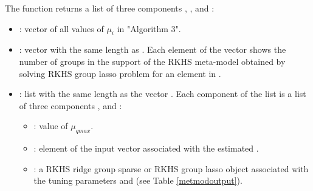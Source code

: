 The  function returns a list of three components , , and :
\begin{itemize}
\item {}: vector of all values of $\mu_i$ in "Algorithm 3".
\item {}: vector with the same length as . Each element of the vector shows the number of groups in the support of the RKHS meta-model obtained by solving RKHS group lasso problem for an element in .
\item {}: list with the same length as the vector . Each component of the list is a list of three components ,  and :
\begin{itemize}
\item {}: value of $\mu_{qmax}$.
\item {}: element of the input vector  associated with the estimated .
\item {}: a RKHS ridge group sparse or RKHS group lasso object associated with the tuning parameters  and  (see Table \ref{metmodoutput}). 
\end{itemize}
\end{itemize}  
